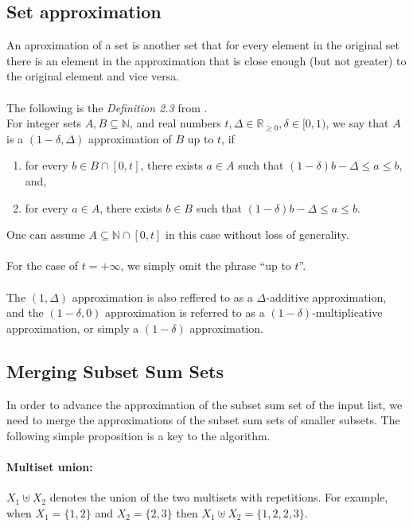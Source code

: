 \subsection{Set approximation}
An aproximation of a set is another set that for every element in the original set there is an element in the approximation that is close enough (but not greater) to the original element and vice versa. \\ \\
The following is the \textit{Definition 2.3} from \cite{deng}. \\
For integer sets \(A, B \subseteq \mathbb{N}\), and real numbers \(t, \Delta \in \mathbb{R}_{\geq 0}, \delta \in [0, 1)\), we say that \(A\) is a \((1 - \delta, \Delta)\) approximation of \(B\) up to \(t\), if
\begin{enumerate}
    \item for every \(b \in B \cap [0, t]\), there exists \(a \in A\) such that \((1 - \delta)b - \Delta \leq a \leq b\), and,
    \item for every \(a \in A\), there exists \(b \in B\) such that \((1 - \delta)b - \Delta \leq a \leq b\).
\end{enumerate}
One can assume \(A \subseteq \mathbb{N} \cap [0, t]\) in this case without loss of generality.
\\ \\
For the case of \(t = +\infty\), we simply omit the phrase “up to \(t\)”.
\\ \\
The \((1, \Delta)\) approximation is also reffered to as a \(\Delta\)-additive approximation, and the \((1 - \delta, 0)\) approximation is referred to as a \((1 - \delta)\)-multiplicative approximation, or simply a \((1 - \delta)\) approximation.\\


\subsection{Merging Subset Sum Sets}

In order to advance the approximation of the subset sum set of the input list, we need to merge the approximations of the subset sum sets of smaller subsets. The following simple proposition is a key to the algorithm.

\paragraph{Multiset union:}
\(X_1 \uplus X_2\) denotes the union of the two multisets with repetitions. For example, when \(X_1 = \{1, 2\}\) and \(X_2 = \{2, 3\}\) then \(X_1 \uplus X_2 = \{1, 2, 2, 3\}\).

